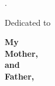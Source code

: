 .\\
\vspace{2.5in}
{\large
\it
\begin{center}
Dedicated to\\
\vskip 0.05in

{\bf My \\
 Mother,  \\
and \\
Father, } 
\end{center}
}
